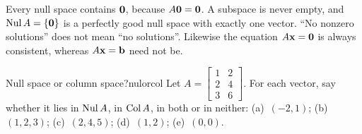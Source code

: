 \documentclass[11pt]{article}
\begin{document}
\begin{warn}
Every null space contains $\mathbf{0}$, because $A\mathbf{0}=\mathbf{0}$. A subspace is never empty, and $\operatorname{Nul} A=\{\mathbf{0}\}$ is a perfectly good null space with exactly one vector. ``No nonzero solutions'' does not mean ``no solutions''. Likewise the equation $A\mathbf{x}=\mathbf{0}$ is always consistent, whereas $A\mathbf{x}=\mathbf{b}$ need not be.
\end{warn}

\begin{kc}{Null space or column space?}{nulorcol}
Let $A=\begin{bmatrix}1&2\\2&4\\3&6\end{bmatrix}$. For each vector, say whether it lies in $\operatorname{Nul} A$, in $\operatorname{Col} A$, in both or in neither: (a)~$(-2,1)$; (b)~$(1,2,3)$; (c)~$(2,4,5)$; (d)~$(1,2)$; (e)~$(0,0)$.
\end{kc}
\end{document}
